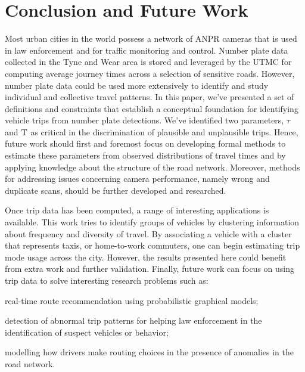 \section{Conclusion and Future Work}\label{s.conclusions}

Most urban cities in the world possess a network of ANPR cameras that is used in law enforcement and for traffic monitoring and control. Number plate data collected in the Tyne and Wear area is stored and leveraged by the UTMC for computing average journey times across a selection of sensitive roads. However, number plate data could be used more extensively to identify and study individual and collective travel patterns. In this paper, we've presented a set of definitions and constraints that establish a conceptual foundation for identifying vehicle trips from number plate detections. We've identified two parameters, $\tau$ and $\mathrm{T}$ as critical in the discrimination of plausible and unplausible trips. Hence, future work should first and foremost focus on developing formal methods to estimate these parameters from observed distributions of travel times and by applying knowledge about the structure of the road network. Moreover, methods for addressing issues concerning camera performance, namely wrong and duplicate scans, should be further developed and researched.

Once trip data has been computed, a range of interesting applications is available. This work tries to identify groups of vehicles by clustering information about frequency and diversity of travel. By associating a vehicle with a cluster that represents taxis, or home-to-work commuters, one can begin estimating trip mode usage across the city. However, the results presented here could benefit from extra work and further validation. Finally, future work can focus on using trip data to solve interesting research problems such as: 
\begin{enumerate*}[label=(\roman*)]
  \item real-time route recommendation using probabilistic graphical models;
  \item detection of abnormal trip patterns for helping law enforcement in the identification of suspect vehicles or behavior;
  \item modelling how drivers make routing choices in the presence of anomalies in the road network.
\end{enumerate*}
